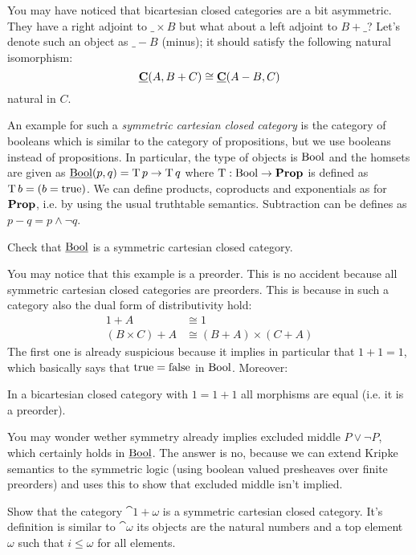 You may have noticed that bicartesian closed categories are a bit asymmetric. They have a right adjoint to $\_\times B$ but what about a left adjoint to $B+\_$? Let's denote such an object as $\_- B$ (minus); it should satisfy the following natural isomorphism:
\[ \underline{\mathbf{C}}(A,B+C) \cong \underline{\mathbf{C}}(A - B,C) \]
natural in $C$. 

An example for such a \emph{symmetric cartesian closed category} is the category of booleans which is similar to the category of propositions, but we use booleans instead of propositions. In particular, the type of objects is $\mathrm{Bool}$ and the homsets are given as 
$\underline{\mathbf{\mathrm{Bool}}}(p,q) = \mathrm{T}\,p \to \mathrm{T}\,q$ where $\mathrm{T} : \mathrm{Bool} \to \mathbf{Prop}$ is defined as $\mathrm{T}\,b = (b = \mathrm{true})$. We can define products, coproducts and exponentials as for $\mathbf{Prop}$, i.e. by using the usual truthtable semantics. Subtraction can be defines as $p-q = p \wedge \neg q$.
\begin{Exercise}
  Check that $\underline{\mathbf{\mathrm{Bool}}}$ is a symmetric cartesian closed category.
\end{Exercise}
You may notice that this example is a preorder. This is no accident because all symmetric cartesian closed categories are preorders. This is because in such a category also the dual form of distributivity hold:
\begin{align*}
  1 +  A & \cong 1 \\
  (B \times C) + A & \cong (B + A) \times (C + A)
\end{align*}
The first one is already suspicious because it implies in particular that $1+1 = 1$, which basically says that $\mathrm{true} = \mathrm{false}$ in $\mathrm{Bool}$. Moreover:
\begin{Exercise}
  In a bicartesian closed category with $1 = 1+1$ all morphisms are equal (i.e. it is a preorder). 
\end{Exercise}
You may wonder wether symmetry already implies excluded middle $P \vee \neg P$, which certainly holds in $\underline{\mathbf{\mathrm{Bool}}}$. The answer is no, because we can extend Kripke semantics to the symmetric logic (using boolean valued presheaves over finite preorders) and uses this to show that excluded middle isn't implied. 

\begin{Exercise}
  Show that the category $\cat{1+\omega}$ is a symmetric cartesian closed category. It's definition is similar to $\cat{\omega}$ its objects are the natural numbers and a top element $\omega$ such that $i \leq \omega$ for all elements.
\end{Exercise}


